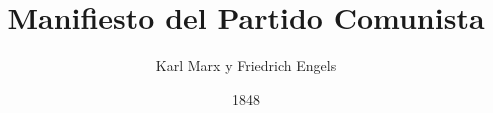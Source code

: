 \documentclass[10pt,a5paper,twoside]{book}
\title{Manifiesto del Partido Comunista}
\author{Karl Marx y Friedrich Engels}
\date{1848}
\begin{document}
\sloppy
\end{document}
